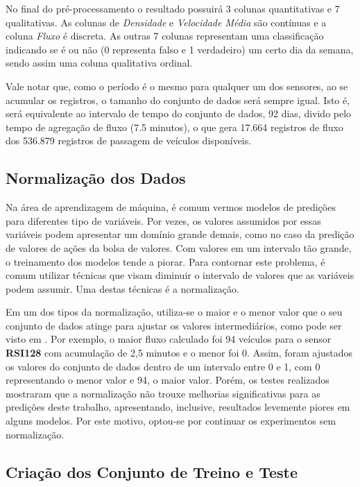 No final do pré-processamento o resultado possuirá 3 colunas quantitativas e 7 qualitativas. As colunas de \textit{Densidade} e \textit{Velocidade Média} são contínuas e a coluna \textit{Fluxo} é discreta. As outras 7 colunas representam uma classificação indicando se é ou não (0 representa falso e 1 verdadeiro) um certo dia da semana, sendo assim uma coluna qualitativa ordinal.

Vale notar que, como o período é o mesmo para qualquer um dos sensores, ao se acumular os registros, o tamanho do conjunto de dados será sempre igual. Isto é, será equivalente ao intervalo de tempo do conjunto de dados, 92 dias, divido pelo tempo de agregação de fluxo (7.5 minutos), o que gera 17.664 registros de fluxo dos 536.879 registros de passagem de veículos disponíveis.

\subsection{Normalização dos Dados}

Na área de aprendizagem de máquina, é comum vermos modelos de predições para diferentes tipo de variáveis. Por vezes, os valores assumidos por essas variáveis podem apresentar um domínio grande demais, como no caso da predição de valores de ações da bolsa de valores. Com valores em um intervalo tão grande, o treinamento dos modelos tende a piorar. Para contornar este problema, é comum utilizar técnicas que visam diminuir o intervalo de valores que as variáveis podem assumir. Uma destas técnicas é a normalização. 

Em um dos tipos da normalização, utiliza-se o maior e o menor valor que o seu conjunto de dados atinge para ajustar os valores intermediários, como pode ser visto em \cite{Dorian_1999}. Por exemplo, o maior fluxo calculado foi 94 veículos para o sensor \textbf{RSI128} com acumulação de 2,5 minutos e o menor foi 0. Assim, foram ajustados os valores do conjunto de dados dentro de um intervalo entre 0 e 1, com 0 representando o menor valor e 94, o maior valor. Porém, os testes realizados mostraram que a normalização não trouxe melhorias significativas para as predições deste trabalho, apresentando, inclusive, resultados levemente piores em alguns modelos. Por este motivo, optou-se por continuar os experimentos sem normalização.

\subsection{Criação dos Conjunto de Treino e Teste}

